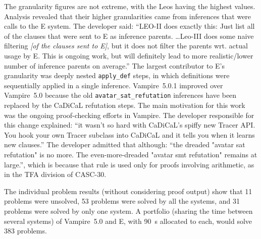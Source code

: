 \documentclass[aic]{iosart2x}
\newcommand{\smalltt}[1]{\small \texttt{#1}}
\newcommand{\LAST}{\mbox{CASC-30}}
\begin{document}
The granularity figures are not extreme, with the Leos having the highest values.
Analysis revealed that their higher granularities came from inferences that were calls to the 
E system.
The developer said: ``LEO-II does exactly this: Just list all of the clauses that were sent to 
E as inference parents. \ldots Leo-III does some naive filtering {\em [of the clauses sent to E]}, 
but it does not filter the parents wrt. actual usage by E. This is ongoing work, but will 
definitely lead to more realistic/lower number of inference parents on average.''
The largest contributor to E's granularity was deeply nested \smalltt{apply\_def} steps, in 
which definitions were sequentially applied in a single inference.
Vampire~5.0.1 improved over Vampire~5.0 because the old \smalltt{avatar\_sat\_refutation} 
inferences have been replaced by the CaDiCaL refutation steps.
The main motivation for this work was the ongoing proof-checking efforts in Vampire.
The developer responsible for this change explained: ``it wasn't so hard with CaDiCaL's 
spiffy new Tracer API. You hook your own Tracer subclass into CaDiCaL and it tells you when 
it learns new clauses.''
The developer admitted that although: ``the dreaded "avatar sat refutation" is no more. The 
even-more-dreaded "avatar smt refutation" remains at large.'', which is because that rule
is used only for proofs involving arithmetic, as in the TFA division of \LAST{}.

The individual problem results (without considering proof output) show that
11 problems were unsolved,
53 problems were solved by all the systems, and
31 problems were solved by only one system.
A portfolio (sharing the time between several systems) of Vampire~5.0 and E, with 90~s
allocated to each, would solve 383 problems.


\end{document}
